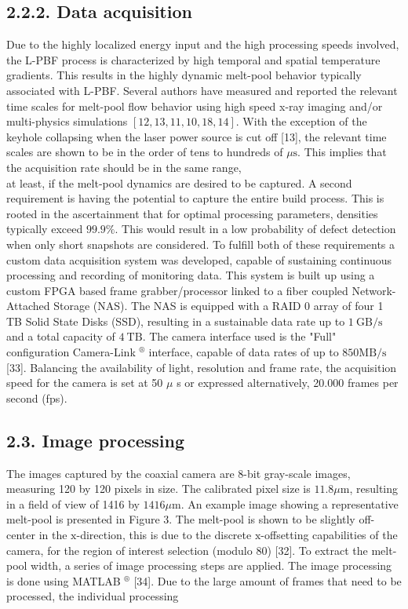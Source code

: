 \documentclass[10pt]{article}
\begin{document}
\subsection*{2.2.2. Data acquisition}
Due to the highly localized energy input and the high processing speeds involved, the L-PBF process is characterized by high temporal and spatial temperature gradients. This results in the highly dynamic melt-pool behavior typically associated with L-PBF. Several authors have measured and reported the relevant time scales for melt-pool flow behavior using high speed x-ray imaging and/or multi-physics simulations $[12,13,11,10,18,14]$. With the exception of the keyhole collapsing when the laser power source is cut off [13], the relevant time scales are shown to be in the order of tens to hundreds of $\mu \mathrm{s}$. This implies that the acquisition rate should be in the same range,\\
at least, if the melt-pool dynamics are desired to be captured. A second requirement is having the potential to capture the entire build process. This is rooted in the ascertainment that for optimal processing parameters, densities typically exceed $99.9 \%$. This would result in a low probability of defect detection when only short snapshots are considered. To fulfill both of these requirements a custom data acquisition system was developed, capable of sustaining continuous processing and recording of monitoring data. This system is built up using a custom FPGA based frame grabber/processor linked to a fiber coupled Network-Attached Storage (NAS). The NAS is equipped with a RAID 0 array of four 1 TB Solid State Disks (SSD), resulting in a sustainable data rate up to $1 \mathrm{~GB} / \mathrm{s}$ and a total capacity of $4 \mathrm{~TB}$. The camera interface used is the "Full" configuration Camera-Link ${ }^{\circledR}$ interface, capable of data rates of up to $850 \mathrm{MB} / \mathrm{s}$ [33]. Balancing the availability of light, resolution and frame rate, the acquisition speed for the camera is set at 50 $\mu$ s or expressed alternatively, 20.000 frames per second (fps).

\subsection*{2.3. Image processing}
The images captured by the coaxial camera are 8-bit gray-scale images, measuring 120 by 120 pixels in size. The calibrated pixel size is $11.8 \mu \mathrm{m}$, resulting in a field of view of 1416 by $1416 \mu \mathrm{m}$. An example image showing a representative melt-pool is presented in Figure 3. The melt-pool is shown to be slightly off-center in the $\mathrm{x}$-direction, this is due to the discrete $\mathrm{x}$-offsetting capabilities of the camera, for the region of interest selection (modulo 80) [32]. To extract the melt-pool width, a series of image processing steps are applied. The image processing is done using MATLAB ${ }^{\circledR}$ [34]. Due to the large amount of frames that need to be processed, the individual processing
\end{document}

